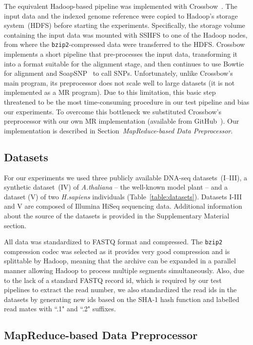 \documentclass[10pt]{article}
\begin{document}
The equivalent Hadoop-based pipeline was implemented with Crossbow~\cite{Langmead:2009kx}. The input
data and the indexed genome reference were copied to Hadoop's storage
system~(HDFS) before starting the experiments.  Specifically, the storage volume
containing the input data was mounted with SSHFS to one of the Hadoop nodes,
from where the \texttt{bzip2}-compressed data were transferred to the HDFS.
Crossbow implements a short pipeline that pre-processes the input data, transforming it into a format suitable for the alignment stage, and then continues to use Bowtie for alignment and SoapSNP~\cite{soapsnp} to call SNPs.  Unfortunately, unlike Crossbow's main program, its preprocessor does not scale well to large datasets (it is not implemented as a MR program). Due to this limitation, this basic step threatened to be the most time-consuming procedure in our test pipeline and bias our experiments. To overcome this bottleneck we substituted Crossbow's preprocessor with our own MR implementation (available from GitHub~\cite{code_repo_mr}). Our implementation is described in Section~{\it MapReduce-based Data Preprocessor}.


\subsection*{Datasets}
For our experiments we used three publicly available DNA-seq datasets~(I--III),
a synthetic dataset~(IV) of {\it A.thaliana} -- the well-known model plant --
and a dataset (V) of two {\it H.sapiens} individuals
(Table~\ref{table:datasets}). Datasets I-III and V are composed of Illumina
HiSeq sequencing data. Additional information about the source of the datasets is
provided in the Supplementary Material section.

All data was standardized to FASTQ format and compressed. The
\texttt{bzip2} compression codec was selected as it provides very good compression
and is splittable by Hadoop, meaning that the archive can be expanded in a
parallel manner allowing Hadoop to process multiple segments simultaneously.
Also, due to the lack of a standard FASTQ record id, which is
required by our test pipelines to extract the read number, we also standardized
the read ids in the datasets by generating new ids based on the SHA-1 hash
function and labelled read mates with ``.1" and ``.2" suffixes.

\subsection*{MapReduce-based Data Preprocessor}
\label{sec:preprocessor}
\end{document}
